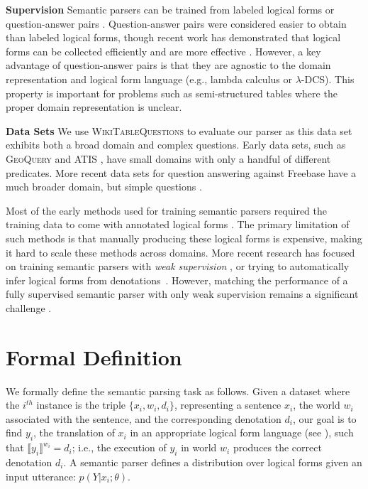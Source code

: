 \textbf{Supervision} Semantic parsers can be trained from labeled logical forms \cite{zelle1996,zettlemoyer05} or question-answer pairs \cite{liang2011learning,berant2013}. Question-answer pairs were considered easier to obtain than labeled logical forms, though recent work has demonstrated that logical forms can be collected efficiently and are more effective \cite{yih2016value}. However, a key advantage of question-answer pairs is that they are agnostic to the domain representation and logical form language (e.g., lambda calculus or $\lambda$-DCS). This property is important for problems such as semi-structured tables where the proper domain representation is unclear.


\textbf{Data Sets} We use \textsc{WikiTableQuestions} to evaluate our parser as this data set exhibits both a broad domain and complex questions.
Early data sets, such as \textsc{GeoQuery} \cite{zelle1996} and \textsc{ATIS} \cite{dahl1994}, have small domains with only a handful of different predicates. More recent data sets for question answering against Freebase have a much broader domain, but simple questions \cite{berant2013,cai2013}.

Most of the early methods used for training semantic parsers required the training data to come with annotated logical forms \cite{zelle1996learning,Zettlemoyer2005LearningTM}.  The primary limitation of such methods is that manually producing these logical forms is expensive, making it hard to scale these methods across domains. More recent research has focused on training semantic parsers with \emph{weak supervision} \cite{liang2011learning,berant2013semantic}, or trying to automatically infer logical forms from denotations~\citep{pasupat2016inferring}. However, matching the performance of a fully supervised semantic parser with only weak supervision remains a significant challenge \cite{Yih2016TheVO}.

\section{Formal Definition}
We formally define the semantic parsing task as follows. Given a dataset where the $i^{th}$ instance is the triple $\{x_i, w_i, d_i\}$, representing a sentence $x_i$, the world $w_i$ associated with the sentence, and the corresponding denotation $d_i$, our goal is to find $y_i$, the translation of $x_i$ in an appropriate logical form language (see ), such that $\llbracket y_i \rrbracket^{w_i} = d_i$;
i.e., the execution of $y_i$ in world $w_i$ produces the correct denotation $d_i$.  A semantic parser defines a distribution over logical forms given an input utterance: $p(Y|x_i; \theta)$.

